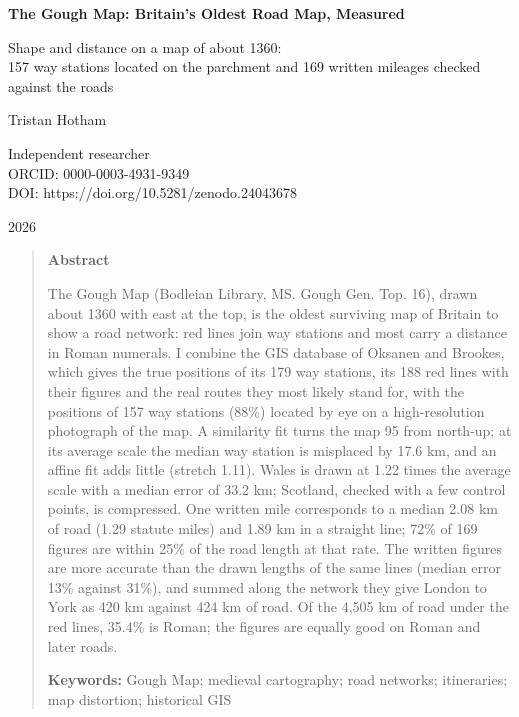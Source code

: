 \documentclass[11pt,a4paper]{article}
\begin{document}
\begin{center}
{\Large\bfseries The Gough Map: Britain's Oldest Road Map, Measured\par}
\vspace{0.4em}
{\large Shape and distance on a map of about 1360:\\157 way stations located on the parchment and 169 written mileages checked against the roads\par}
\vspace{1.2em}
{\large Tristan Hotham\par}
\vspace{0.3em}
{\small Independent researcher\\
ORCID: 0000-0003-4931-9349\\
DOI: https://doi.org/10.5281/zenodo.24043678\par}
\vspace{0.8em}
2026
\end{center}

\begin{quote}
\small
\begin{center}\textbf{Abstract}\end{center}
The Gough Map (Bodleian Library, MS. Gough Gen. Top. 16), drawn about 1360 with east at the top, is the oldest surviving map of Britain to show a road network: red lines join way stations and most carry a distance in Roman numerals. I combine the GIS database of Oksanen and Brookes, which gives the true positions of its 179 way stations, its 188 red lines with their figures and the real routes they most likely stand for, with the positions of 157 way stations (88\%) located by eye on a high-resolution photograph of the map. A similarity fit turns the map 95\textdegree{} from north-up; at its average scale the median way station is misplaced by 17.6 km, and an affine fit adds little (stretch 1.11). Wales is drawn at 1.22 times the average scale with a median error of 33.2 km; Scotland, checked with a few control points, is compressed. One written mile corresponds to a median 2.08 km of road (1.29 statute miles) and 1.89 km in a straight line; 72\% of 169 figures are within 25\% of the road length at that rate. The written figures are more accurate than the drawn lengths of the same lines (median error 13\% against 31\%), and summed along the network they give London to York as 420 km against 424 km of road. Of the 4,505 km of road under the red lines, 35.4\% is Roman; the figures are equally good on Roman and later roads.

\textbf{Keywords:} Gough Map; medieval cartography; road networks; itineraries; map distortion; historical GIS
\end{quote}
\end{document}
